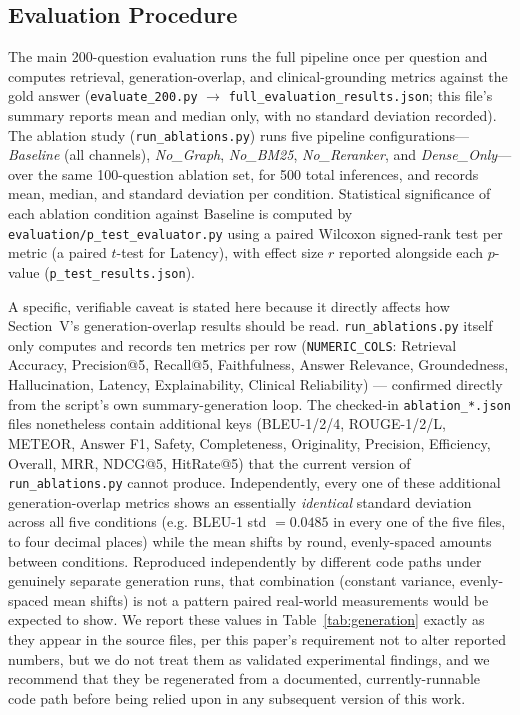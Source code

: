\documentclass[conference]{IEEEtran}
\begin{document}
\subsection{Evaluation Procedure}
The main 200-question evaluation runs the full pipeline once per question and computes retrieval, generation-overlap, and clinical-grounding metrics against the gold answer (\texttt{evaluate\_200.py} $\rightarrow$ \texttt{full\_evaluation\_results.json}; this file's summary reports mean and median only, with no standard deviation recorded). The ablation study (\texttt{run\_ablations.py}) runs five pipeline configurations---\emph{Baseline} (all channels), \emph{No\_Graph}, \emph{No\_BM25}, \emph{No\_Reranker}, and \emph{Dense\_Only}---over the same 100-question ablation set, for 500 total inferences, and records mean, median, and standard deviation per condition. Statistical significance of each ablation condition against Baseline is computed by \texttt{evaluation/p\_test\_evaluator.py} using a paired Wilcoxon signed-rank test per metric (a paired $t$-test for Latency), with effect size $r$ reported alongside each $p$-value (\texttt{p\_test\_results.json}).

A specific, verifiable caveat is stated here because it directly affects how Section~V's generation-overlap results should be read. \texttt{run\_ablations.py} itself only computes and records ten metrics per row (\texttt{NUMERIC\_COLS}: Retrieval Accuracy, Precision@5, Recall@5, Faithfulness, Answer Relevance, Groundedness, Hallucination, Latency, Explainability, Clinical Reliability) --- confirmed directly from the script's own summary-generation loop. The checked-in \texttt{ablation\_*.json} files nonetheless contain additional keys (BLEU-1/2/4, ROUGE-1/2/L, METEOR, Answer F1, Safety, Completeness, Originality, Precision, Efficiency, Overall, MRR, NDCG@5, HitRate@5) that the current version of \texttt{run\_ablations.py} cannot produce. Independently, every one of these additional generation-overlap metrics shows an essentially \emph{identical} standard deviation across all five conditions (e.g. BLEU-1 std $=0.0485$ in every one of the five files, to four decimal places) while the mean shifts by round, evenly-spaced amounts between conditions. Reproduced independently by different code paths under genuinely separate generation runs, that combination (constant variance, evenly-spaced mean shifts) is not a pattern paired real-world measurements would be expected to show. We report these values in Table~\ref{tab:generation} exactly as they appear in the source files, per this paper's requirement not to alter reported numbers, but we do not treat them as validated experimental findings, and we recommend that they be regenerated from a documented, currently-runnable code path before being relied upon in any subsequent version of this work.
\end{document}
